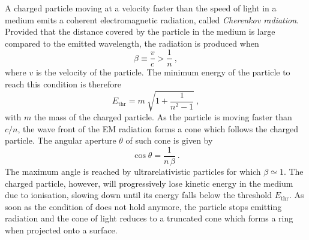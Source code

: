A charged particle moving at a velocity faster than the speed of light in a medium %
emits a coherent electromagnetic radiation, called \emph{Cherenkov radiation}. %
Provided that the distance covered by the particle in the medium is large compared to the emitted wavelength, %
the radiation is produced when~\cite{Cerenkov:1937vh}
\begin{equation}
	\label{eq:cherenkov}
	\beta \equiv \frac{v}{c} > \frac{1}{n}\ ,
\end{equation}
where $v$ is the velocity of the particle.
The minimum energy of the particle to reach this condition is therefore
\begin{equation}
	\label{eq:cherenkov_threshold}
	E_\text{thr} = m\ \sqrt{1 + \frac{1}{n^2-1}}\ ,
\end{equation}
with $m$ the mass of the charged particle.
As the particle is moving faster than $c / n$, the wave front of the EM radiation forms a cone %
which follows the charged particle.
The angular aperture $\theta$ of such cone is given by
\begin{equation}
	\label{eq:cherenkov_angle}
	\cos \theta = \frac{1}{n\,\beta} \ .
\end{equation}
The maximum angle is reached by ultrarelativistic particles for which $\beta \simeq 1$.
The charged particle, however, will progressively lose kinetic energy in the medium due to ionisation, %
slowing down until its energy falls below the threshold $E_\text{thr}$.
As soon as the condition of  does not hold anymore, %
the particle stops emitting radiation and the cone of light reduces to a truncated cone %
which forms a ring when projected onto a surface.

